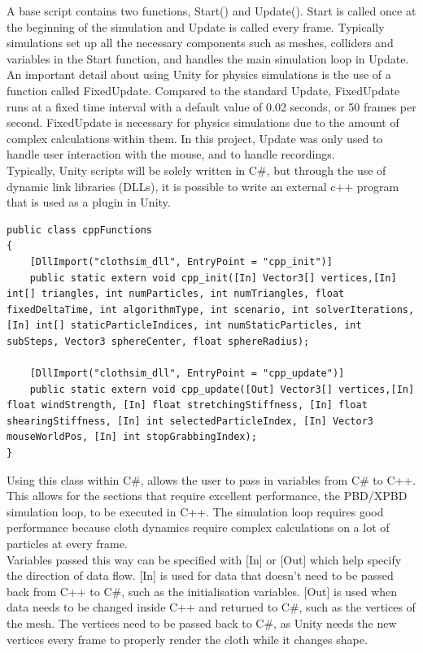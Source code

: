 \documentclass[12pt,a4paper]{article}
\begin{document}
A base script contains two functions, Start() and Update(). Start is called once at the beginning of the simulation and Update is called every frame. Typically simulations set up all the necessary components such as meshes, colliders and variables in the Start function, and handles the main simulation loop in Update. An important detail about using Unity for physics simulations is the use of a function called FixedUpdate. Compared to the standard Update, FixedUpdate runs at a fixed time interval with a default value of 0.02 seconds, or 50 frames per second. FixedUpdate is necessary for physics simulations due to the amount of complex calculations within them. In this project, Update was only used to handle user interaction with the mouse, and to handle recordings. \\

Typically, Unity scripts will be solely written in C\#, but through the use of dynamic link libraries (DLLs), it is possible to write an external c++ program that is used as a plugin in Unity.

\begin{lstlisting}[caption={Interfacing C++ functions with Unity},label={lst:cppinterface}]
public class cppFunctions
{
	[DllImport("clothsim_dll", EntryPoint = "cpp_init")]
	public static extern void cpp_init([In] Vector3[] vertices,[In] int[] triangles, int numParticles, int numTriangles, float fixedDeltaTime, int algorithmType, int scenario, int solverIterations, [In] int[] staticParticleIndices, int numStaticParticles, int subSteps, Vector3 sphereCenter, float sphereRadius);
	
	[DllImport("clothsim_dll", EntryPoint = "cpp_update")]
	public static extern void cpp_update([Out] Vector3[] vertices,[In] float windStrength, [In] float stretchingStiffness, [In] float shearingStiffness, [In] int selectedParticleIndex, [In] Vector3 mouseWorldPos, [In] int stopGrabbingIndex);
}\end{lstlisting}
Using this class within C\#, allows the user to pass in variables from C\# to C++. This allows for the sections that require excellent performance, the PBD/XPBD simulation loop, to be executed in C++. The simulation loop requires good performance because cloth dynamics require complex calculations on a lot of particles at every frame.\\ 

Variables passed this way can be specified with [In] or [Out] which help specify the direction of data flow. [In] is used for data that doesn't need to be passed back from C++ to C\#, such as the initialisation variables. [Out] is used when data needs to be changed inside C++ and returned to C\#, such as the vertices of the mesh. The vertices need to be passed back to C\#, as Unity needs the new vertices every frame to properly render the cloth while it changes shape.\\ 
\end{document}
